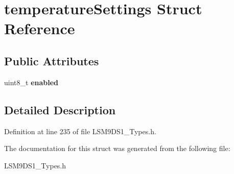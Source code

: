 \hypertarget{structtemperatureSettings}{}\section{temperature\+Settings Struct Reference}
\label{structtemperatureSettings}
\subsection*{Public Attributes}
\begin{DoxyCompactItemize}
\item 
\mbox{\label{structtemperatureSettings_aeb258e2620d85e2f72fc057dbffa9715}} 
uint8\+\_\+t {\bfseries enabled}
\end{DoxyCompactItemize}


\subsection{Detailed Description}


Definition at line 235 of file L\+S\+M9\+D\+S1\+\_\+\+Types.\+h.



The documentation for this struct was generated from the following file\+:\begin{DoxyCompactItemize}
\item 
L\+S\+M9\+D\+S1\+\_\+\+Types.\+h\end{DoxyCompactItemize}
